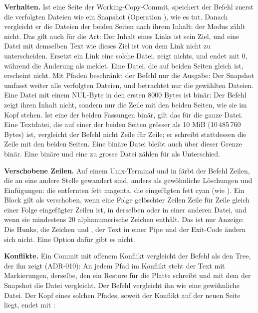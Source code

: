 {\bf Verhalten.} Ist eine Seite der Working-Copy-Commit, speichert der Befehl zuerst die
verfolgten Dateien wie ein Snapshot (Operation ), wie  es tut.
Danach vergleicht er die Dateien der beiden Seiten nach ihrem Inhalt; der Modus zählt nicht.
Das gilt auch für die Art: Der Inhalt eines Links ist sein Ziel, und eine Datei mit demselben
Text wie dieses Ziel ist von dem Link nicht zu unterscheiden. Ersetzt ein Link eine solche
Datei, zeigt  nichts, und  endet mit 0, während 
die Änderung als  meldet.
Eine Datei, die auf beiden Seiten gleich ist, erscheint nicht.
Mit Pfaden beschränkt der Befehl nur die Ausgabe: Der Snapshot umfasst weiter alle verfolgten
Dateien, und  betrachtet nur die gewählten Dateien.
Eine Datei mit einem NUL-Byte in den ersten 8000 Bytes ist binär: Der Befehl zeigt ihren
Inhalt nicht, sondern nur die Zeile  mit den beiden
Seiten, wie sie im Kopf stehen. Ist eine der beiden Fassungen binär, gilt das für die ganze Datei.
Eine Textdatei, die auf einer der beiden Seiten grösser als 10 MiB (10\,485\,760 Bytes) ist,
vergleicht der Befehl nicht Zeile für Zeile; er schreibt stattdessen die Zeile
 mit den beiden Seiten.
Eine binäre Datei bleibt auch über dieser Grenze binär.
Eine binäre und eine zu grosse Datei zählen für  als Unterschied.

{\bf Verschobene Zeilen.} Auf einem Unix-Terminal und in  färbt der Befehl Zeilen, die
an eine andere Stelle gewandert sind, anders als gewöhnliche Löschungen und Einfügungen:
die entfernten fett magenta, die eingefügten fett cyan (wie ).
Ein Block gilt als verschoben, wenn eine Folge gelöschter Zeilen Zeile für Zeile gleich einer
Folge eingefügter Zeilen ist, in derselben oder in einer anderen Datei, und wenn sie mindestens
20 alphanumerische Zeichen enthält. Das ist nur Anzeige: Die Hunks, die Zeichen \type{-} und
\type{+}, der Text in einer Pipe und der Exit-Code ändern sich nicht. Eine Option dafür gibt
es nicht.

{\bf Konflikte.} Ein Commit mit offenem Konflikt vergleicht der Befehl als den Tree, der ihn
zeigt (ADR-010): An jedem Pfad im Konflikt steht der Text mit Markierungen, derselbe, den ein
Restore für die Platte schreibt und mit dem der Snapshot die Datei vergleicht. Der Befehl
vergleicht ihn wie eine gewöhnliche Datei.
Der Kopf eines solchen Pfades, soweit der Konflikt auf der neuen Seite
liegt, endet mit :

